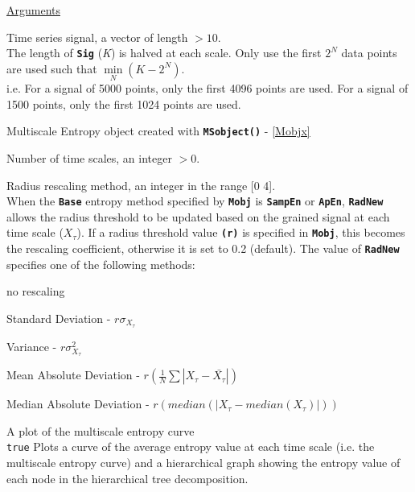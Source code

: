 \documentclass[12pt, a4paper, titlepage, openany]{book}
\begin{document}
\noindent \ul{Arguments}
\begin{description}[labelsep=1cm, labelwidth=2cm, nosep, style=multiline,leftmargin=3cm]\footnotesize
\item[\texttt{Sig}]		Time series signal, a vector of length $> 10$.\\
	The length of \texttt{\textbf{Sig}} (\emph{K}) is halved at each scale. Only use the first $2^N$ data points are used such that $\underset{N}{\min}(K - 2^N)$.\\
i.e. For a signal of 5000 points, only the first 4096 points are used. For a signal of 1500 points, only the first 1024 points are used.
\item[\texttt{Mobj}]	Multiscale Entropy object created with \texttt{\textbf{MSobject()}} - \ref{Mobjx}
\item[\texttt{Scales}]		Number of time scales, an integer  $> 0$.
\item[\texttt{RadNew}]			Radius rescaling method, an integer in the range [0 4].\\
				 When the \texttt{\textbf{Base}} entropy method specified by \texttt{\textbf{Mobj}} is \texttt{\textbf{SampEn}} or \texttt{\textbf{ApEn}}, \texttt{\textbf{RadNew}} allows the radius threshold to be updated based on the grained signal at each time scale ($X_\tau$). If a radius threshold value \texttt{\textbf{(r)}} is specified in \texttt{\textbf{Mobj}},  this becomes the rescaling coefficient, otherwise it is set to 0.2 (default). The value of \texttt{\textbf{RadNew}} specifies one of the following methods:
	\begin{description}[labelsep=5em, labelwidth=4em, nosep,style=multiline,leftmargin=2cm]
		\item[0]	no rescaling
		\item[1]    Standard Deviation          - $r\sigma_{X_\tau}$
        \item[2]    Variance                    - $r\sigma_{X_\tau}^2$
        \item[3]    Mean Absolute Deviation     - $r(\frac{1}{N} \sum |X_{\tau} - \bar{X_{\tau}}|) $
        \item[4]    Median Absolute Deviation   - $r(median(|X_{\tau} - median(X_{\tau})|)) $
	\end{description} 
\item[\texttt{Plotx}]		A plot of the multiscale entropy curve\\
							\texttt{true} \hspace{15pt} Plots a curve of the average entropy value at each time scale (i.e. the multiscale entropy curve) and a hierarchical graph showing the entropy value of each node     in the hierarchical tree decomposition.\\

\end{description}
\end{document}
